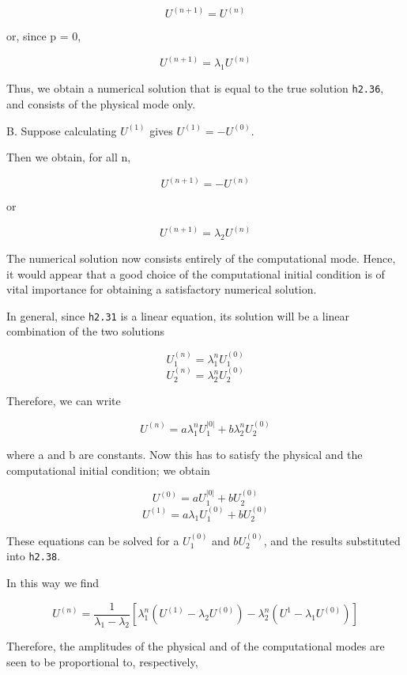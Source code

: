 \[U^{\left( n + 1 \right)} = U^{\left( n \right)}\]

or, since p = 0,

\[U^{\left( n + 1 \right)} = \lambda_{1}U^{\left( n \right)}\]

Thus, we obtain a numerical solution that is equal to the true solution
\texttt{h2.36}, and consists of the physical mode only.

B. Suppose calculating \(U^{\left( 1 \right)}\) gives
\(U^{\left( 1 \right)} = - U^{\left( 0 \right)}\).

Then we obtain, for all n,

\[U^{\left( n + 1 \right)} = - U^{\left( n \right)}\]

or

\[U^{\left( n + 1 \right)} = \lambda_{2}U^{\left( n \right)}\]

The numerical solution now consists entirely of the computational mode.
Hence, it would appear that a good choice of the computational initial
condition is of vital importance for obtaining a satisfactory numerical
solution.

In general, since \texttt{h2.31} is a linear equation, its solution will
be a linear combination of the two solutions

\[U_{1}^{\left( n \right)} = \lambda_{1}^{n}U_{1}^{\left( 0 \right)}\]\[U_{2}^{\left( n \right)} = \lambda_{2}^{n}U_{2}^{\left( 0 \right)}\]

Therefore, we can write

\[U^{\left( n \right)} = a\lambda_{1}^{n}U_{1}^{\left| 0 \right|} + b\lambda_{2}^{n}U_{2}^{\left( 0 \right)}\]

where a and b are constants. Now this has to satisfy the physical and
the computational initial condition; we obtain

\[U^{\left( 0 \right)} = a U_{1}^{\left| 0 \right|} + b U_{2}^{\left( 0 \right)}\]\[U^{\left( 1 \right)} = a\lambda_{1}U_{1}^{\left( 0 \right)} + b U_{2}^{\left( 0 \right)}\]

These equations can be solved for a \(U_{1}^{\left( 0 \right)}\) and
\(bU_{2}^{\left( 0 \right)}\), and the results substituted into
\texttt{h2.38}.

In this way we find

\[U^{(n)} = \frac{1}{\lambda_1 - \lambda_2} \left[ \lambda_1^n\left( U^{(1)}
- \lambda_{2}U^{(0)} \right) - \lambda_2^n\left( U^1 - \lambda_{1}U^{(0)} \right) \right]\]

Therefore, the amplitudes of the physical and of the computational modes
are seen to be proportional to, respectively,

